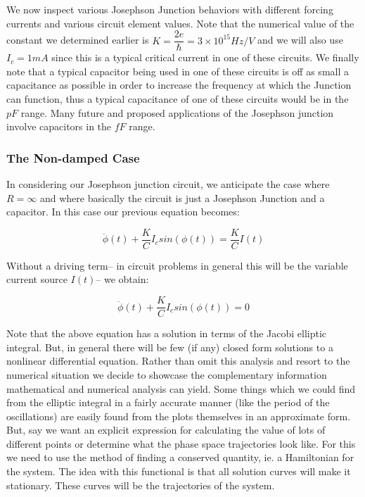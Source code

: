 \documentclass[12pt]{article}
\begin{document}
We now inspect various Josephson Junction behaviors with different forcing currents and various circuit element values.  Note that the numerical value of the constant we determined earlier is $K = \dfrac{2e}{\hbar} = 3 \times 10^{15} Hz/V$ and we will also use $I_c = 1 mA$ since this is a typical critical current in one of these circuits.  We finally note that a typical capacitor being used in one of these circuits is off as small a capacitance as possible in order to increase the frequency at which the Junction can function, thus a typical capacitance of one of these circuits would be in the $pF$ range.  Many future and proposed applications of the Josephson junction involve capacitors in the $fF$ range.

\subsubsection{The Non-damped Case}

In considering our Josephson junction circuit, we anticipate the case where $R = \infty$ and where basically the circuit is just a Josephson Junction and a capacitor.  In this case our previous equation becomes:

\begin{equation}
\ddot{\phi}(t) + \dfrac{K}{C} I_c sin(\phi(t)) = \dfrac{K}{C} I(t)
\end{equation}

Without a driving term-- in circuit problems in general this will be the variable current source $I(t)$-- we obtain:

\begin{equation}
\ddot{\phi}(t) + \dfrac{K}{C} I_c sin(\phi(t)) = 0
\end{equation}

Note that the above equation has a solution in terms of the Jacobi elliptic integral.  But, in general there will be few (if any) closed form solutions to a nonlinear differential equation.  Rather than omit this analysis and resort to the numerical situation we decide to showcase the complementary information mathematical and numerical analysis can yield.  Some things which we could find from the elliptic integral in a fairly accurate manner (like the period of the oscillations) are easily found from the plots themselves in an approximate form.  But, say we want an explicit expression for calculating the value of lots of different points or determine what the phase space trajectories look like.  For this we need to use the method of finding a conserved quantity, ie. a Hamiltonian for the system.  The idea with this functional is that all solution curves will make it stationary.  These curves will be the trajectories of the system.
\end{document}
